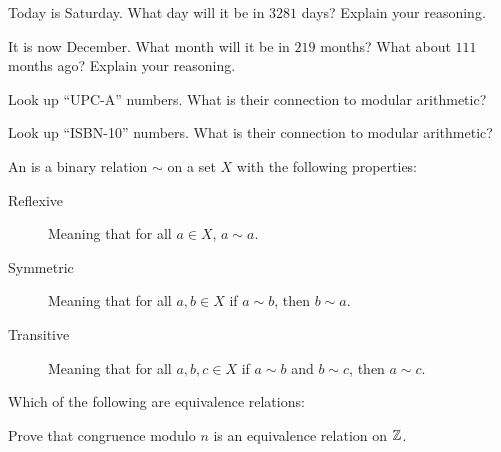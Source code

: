 \documentclass{ximera}
\begin{document}
\begin{exercise}
  Today is Saturday. What day will it be in $3281$ days? Explain your
  reasoning.
\end{exercise}

\begin{exercise}
  It is now December. What month will it be in $219$ months? What about
  $111$ months ago? Explain your reasoning.
\end{exercise}


\begin{exercise}
  Look up ``UPC-A'' numbers. What is their connection to modular
  arithmetic?
\end{exercise}


\begin{exercise}
  Look up ``ISBN-10'' numbers. What is their connection to modular
  arithmetic?
\end{exercise}

\begin{definition}
  An  is a binary relation $\sim$ on a set
  $X$ with the following properties:
  \begin{description}
  \item[Reflexive] Meaning that for all $a\in X$, $a\sim a$.
  \item[Symmetric] Meaning that for all $a,b\in X$ if $a\sim b$, then
    $b\sim a$.
  \item[Transitive] Meaning that for all $a,b,c\in X$ if $a\sim b$ and
    $b \sim c$, then $a\sim c$.
  \end{description}
\end{definition}


\begin{exercise}
  Which of the following are equivalence relations:
  \begin{selectAll}
  \end{selectAll}
\end{exercise}

\begin{exercise}
  Prove that congruence modulo $n$ is an equivalence relation on $\mathbb Z$.
\end{exercise}
\end{document}
